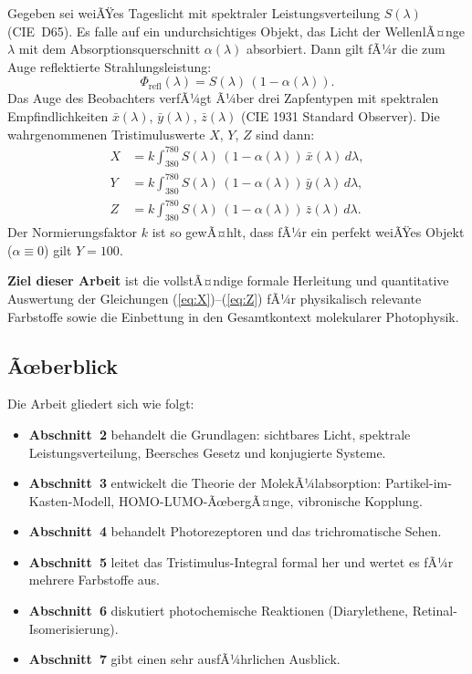﻿\documentclass[a4paper,12pt]{article}
\theoremstyle{definition}
\begin{document}
Gegeben sei weiÃŸes Tageslicht mit spektraler Leistungsverteilung $S(\lambda)$ (CIE~D65).
Es falle auf ein undurchsichtiges Objekt, das Licht der WellenlÃ¤nge $\lambda$
mit dem Absorptionsquerschnitt $\alpha(\lambda)$ absorbiert. Dann gilt fÃ¼r die zum Auge
reflektierte Strahlungsleistung:
\[
  \Phi_{\mathrm{refl}}(\lambda) = S(\lambda)\,(1 - \alpha(\lambda)).
\]
Das Auge des Beobachters verfÃ¼gt Ã¼ber drei Zapfentypen mit spektralen Empfindlichkeiten
$\bar{x}(\lambda)$, $\bar{y}(\lambda)$, $\bar{z}(\lambda)$ (CIE 1931 Standard Observer).
Die wahrgenommenen Tristimuluswerte $X$, $Y$, $Z$ sind dann:
\begin{align}
  X &= k \int_{380}^{780} S(\lambda)\,(1-\alpha(\lambda))\,\bar{x}(\lambda)\,d\lambda, \label{eq:X}\\
  Y &= k \int_{380}^{780} S(\lambda)\,(1-\alpha(\lambda))\,\bar{y}(\lambda)\,d\lambda, \label{eq:Y}\\
  Z &= k \int_{380}^{780} S(\lambda)\,(1-\alpha(\lambda))\,\bar{z}(\lambda)\,d\lambda. \label{eq:Z}
\end{align}
Der Normierungsfaktor $k$ ist so gewÃ¤hlt, dass fÃ¼r ein perfekt weiÃŸes Objekt ($\alpha \equiv 0$)
gilt $Y = 100$.

\textbf{Ziel dieser Arbeit} ist die vollstÃ¤ndige formale Herleitung und quantitative Auswertung
der Gleichungen (\ref{eq:X})--(\ref{eq:Z}) fÃ¼r physikalisch relevante Farbstoffe sowie die
Einbettung in den Gesamtkontext molekularer Photophysik.

\subsection{Ãœberblick}

Die Arbeit gliedert sich wie folgt:
\begin{itemize}
  \item \textbf{Abschnitt~2} behandelt die Grundlagen: sichtbares Licht, spektrale Leistungsverteilung, Beersches Gesetz und konjugierte Systeme.
  \item \textbf{Abschnitt~3} entwickelt die Theorie der MolekÃ¼labsorption: Partikel-im-Kasten-Modell, HOMO-LUMO-ÃœbergÃ¤nge, vibronische Kopplung.
  \item \textbf{Abschnitt~4} behandelt Photorezeptoren und das trichromatische Sehen.
  \item \textbf{Abschnitt~5} leitet das Tristimulus-Integral formal her und wertet es fÃ¼r mehrere Farbstoffe aus.
  \item \textbf{Abschnitt~6} diskutiert photochemische Reaktionen (Diarylethene, Retinal-Isomerisierung).
  \item \textbf{Abschnitt~7} gibt einen sehr ausfÃ¼hrlichen Ausblick.
\end{itemize}
\end{document}

